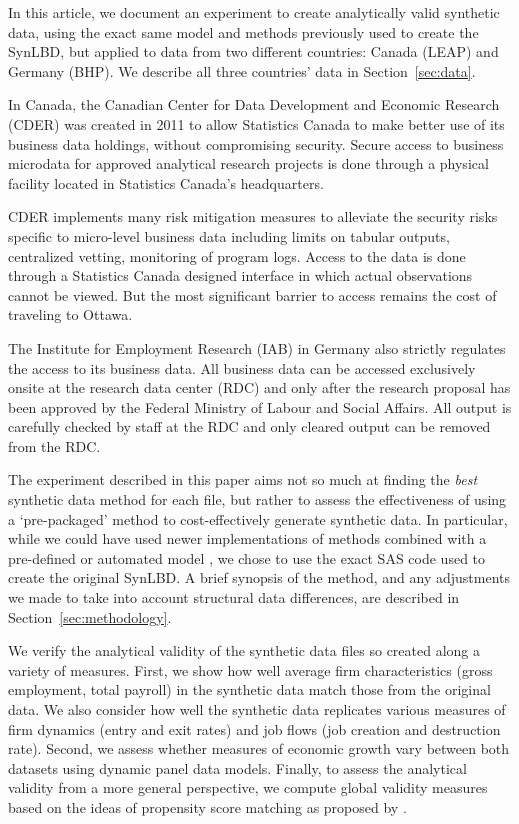 \documentclass[10pt,twoside]{article}
\begin{document}
In this article, we document an experiment to create analytically valid synthetic data, using the exact same model and methods previously used to create the \ac{SynLBD}, but applied to data from two different countries: Canada (\ac{LEAP}) and Germany (\ac{BHP}). We describe all three countries' data in Section~\ref{sec:data}. 


In Canada, the Canadian Center for Data Development and Economic Research (CDER) was created in 2011 to allow Statistics Canada to make better use of its business data holdings, without compromising security. Secure access  to business microdata for approved analytical research projects is done through a physical facility located in Statistics Canada’s headquarters. 

CDER implements many risk mitigation measures to alleviate the security risks specific to micro-level business data including limits on tabular outputs, centralized vetting, monitoring of program logs. Access to the data is done through a Statistics Canada designed interface in which actual observations cannot be viewed. But the most significant barrier to access remains the  cost of traveling to Ottawa.

The Institute for Employment Research (IAB) in Germany also strictly regulates the access to its business data. All business data can  be accessed exclusively onsite at the research data center (RDC) and only after the research proposal has been approved by the Federal Ministry of Labour and Social Affairs. All output is carefully checked by staff at the RDC and only cleared output can be removed  from the RDC. 

The experiment described in this paper aims not so much at finding the \textit{best} synthetic data method for each file, but rather to assess the effectiveness of using a `pre-packaged' method to cost-effectively generate synthetic data. In particular, while we could have used newer implementations of methods combined with a pre-defined or automated model \citep{JSSv074i11,Raab_Nowok_Dibben_2018}, we chose to use the exact SAS code used to create the original \ac{SynLBD}. A brief synopsis of the  method, and any adjustments we made to take into account structural data differences, are described in Section~\ref{sec:methodology}.

We verify the analytical validity of the synthetic data files so created along a variety of measures. First, we show how well average firm characteristics (gross employment, total payroll) in the synthetic data  match those from the original data. We also consider how well the synthetic data  replicates various measures of firm dynamics (entry and exit rates) and job flows (job creation and destruction rate). Second, we assess whether measures of economic growth vary between both datasets using dynamic panel data models. Finally, to assess the analytical validity from a more general perspective, we  compute global validity measures based on the ideas of propensity score matching as proposed by \citet{Woo_Reiter_Oganian_Karr_2009,Snoke_RSSA2018}.
\end{document}
